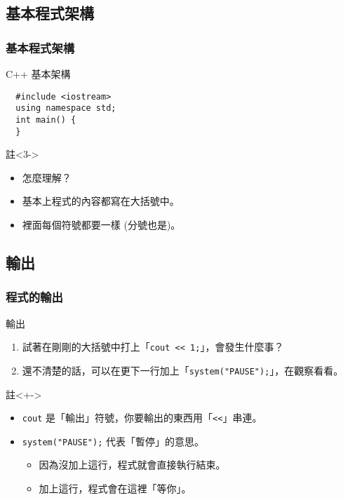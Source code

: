 \documentclass[utf8]{beamer}
\begin{document}
\begin{CJK}{UTF8}{bkai}
\subsection{基本程式架構}

\begin{frame}[fragile]
  \frametitle{基本程式架構}
  \begin{block}{C++ 基本架構}
    \pause
    \begin{lstlisting}
  #include <iostream>
  using namespace std;
  int main() {
  }
    \end{lstlisting}
  \end{block}
  \begin{exampleblock}{註}<3->
    \begin{itemize}
    \item 怎麼理解？
    \item<5-> 基本上程式的內容都寫在\alert{大括號}中。
    \item<6-> 裡面每個符號都要一樣 (分號也是)。
    \end{itemize}
  \end{exampleblock}
\end{frame}

\subsection{輸出}

\begin{frame}[fragile]
  \frametitle{程式的輸出}
  \begin{block}{輸出}
    \begin{enumerate}[<+->]
      \item 試著在剛剛的大括號中打上「\lstinline{cout << 1;}{}」，會發生什麼事？
      \item 還不清楚的話，可以在更下一行加上「\lstinline{system("PAUSE");}{}」，在觀察看看。
    \end{enumerate}
  \end{block}
  \begin{exampleblock}{註}<+->
    \begin{itemize}
    \item \lstinline{cout}{} 是「輸出」符號，你要輸出的東西用「\lstinline{<<}{}」串連。
    \item<+-> \lstinline{system("PAUSE");}{} 代表「暫停」的意思。
      \begin{itemize}[<+->]
      \item 因為沒加上這行，程式就會直接執行結束。
      \item 加上這行，程式會在這裡「等你」。
      \end{itemize}
    \end{itemize}
  \end{exampleblock}
\end{frame}


\end{CJK}
\end{document}
